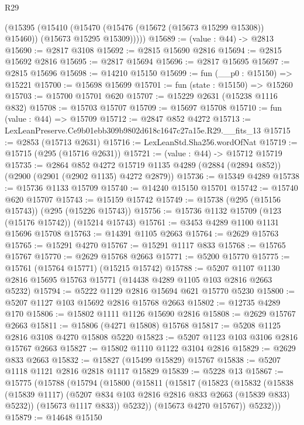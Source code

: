 \begin{lexlean}{R29}
\begin{coremodule}
        (@15395
          (@15410
            (@15470 (@15476 (@15672 (@15673 @15299 @15308)) @15460))
            (@15673 @15295 @15309)))))
@15689 := (value : @44) -> @2813
@15690 := @2817 @3108
@15692 := @2815 @15690 @2816
@15694 := @2815 @15692 @2816
@15695 := @2817 @15694
@15696 := @2817 @15695
@15697 := @2815 @15696
@15698 := @14210 @15150
@15699 := fun (__p0 : @15150) => @15221
@15700 := @15698 @15699
@15701 := fun (state : @15150) => @15260
@15703 := @15700 @15701 @620
@15707 := @15229 @2631 (@15238 @1116 @832)
@15708 := @15703 @15707
@15709 := @15697 @15708
@15710 := fun (value : @44) => @15709
@15712 := @2847 @852 @4272
@15713 := LexLeanPreserve.Ce9b01ebb309b9802d618c1647c27a15e.R29.__fits_13
@15715 := @2853 (@15713 @2631)
@15716 := LexLeanStd.Sha256.wordOfNat
@15719 := @15715 (@295 (@15716 @2631))
@15721 := (value : @44) -> @15712 @15719
@15735 := @2864
    @852
    @4272
    @15719
    @1135
    @4289
    (@2884 (@2894 @852))
    (@2900 (@2901 (@2902 @1135) @4272 @2879))
@15736 := @15349 @4289
@15738 := @15736 @1133 @15709
@15740 := @14240 @15150 @15701
@15742 := @15740 @620 @15707
@15743 := @15159 @15742
@15749 := @15738 (@295 (@15156 @15743)) (@295 (@15226 @15743))
@15756 := @15736 @1132 @15709 (@123 (@15176 @15742)) (@15214 @15743)
@15761 := @3453 @4289 @1100 @1131 @15696 @15708
@15763 := @14391 @1105 @2663
@15764 := @2629 @15763
@15765 := @15291 @4270
@15767 := @15291 @1117 @833
@15768 := @15765 @15767
@15770 := @2629 @15768 @2663
@15771 := @5200 @15770
@15775 := @15761 (@15764 @15771) (@15215 @15742)
@15788 := @5207 @1107 @1130 @2816 @15695 @15763 @15771 (@14438 @4289 @1105 @103 @2816 @2663 @5232)
@15794 := @5222 @1129 @2816 @15694 @621 @15770 @5230
@15800 := @5207 @1127 @103 @15692 @2816 @15768 @2663
@15802 := @12735 @4289 @170
@15806 := @15802 @1111 @1126 @15690 @2816
@15808 := @2629 @15767 @2663
@15811 := @15806 (@4271 @15808) @15768
@15817 := @5208 @1125 @2816 @3108 @4270 @15808 @5220
@15823 := @5207 @1123 @103 @3106 @2816 @15767 @2663
@15827 := @15802 @1110 @1122 @3104 @2816
@15829 := @2629 @833 @2663
@15832 := @15827 (@15499 @15829) @15767
@15838 := @5207 @1118 @1121 @2816 @2818 @1117 @15829
@15839 := @5228 @13
@15867 := @15775
    (@15788
      (@15794
        (@15800
          (@15811
            (@15817
              (@15823
                (@15832
                  (@15838
                    (@15839 @1117)
                    (@5207 @834 @103 @2816 @2816 @833 @2663 (@15839 @833) @5232))
                  (@15673 @1117 @833))
                @5232))
            (@15673 @4270 @15767))
          @5232)))
@15879 := @14648
    @15150

\end{coremodule}
\end{lexlean}
